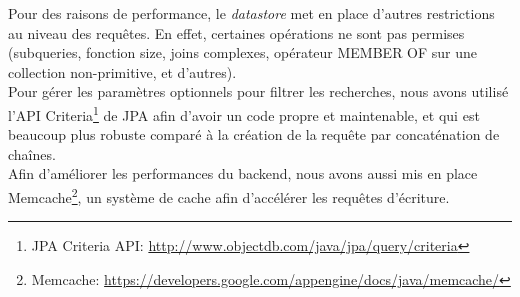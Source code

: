 Pour des raisons de performance, le \emph{datastore} met en place d’autres
restrictions au niveau des requêtes. En effet, certaines opérations ne sont pas permises
(subqueries, fonction size, joins complexes, opérateur MEMBER OF sur une
collection non-primitive, et d'autres).\\

Pour gérer les paramètres optionnels pour filtrer les recherches, nous avons
utilisé l’API Criteria\footnote{JPA Criteria API:
\url{http://www.objectdb.com/java/jpa/query/criteria}} de JPA afin d’avoir un
code propre et maintenable, et qui est beaucoup plus robuste comparé à la
création de la requête par concaténation de chaînes.\\

Afin d'améliorer les performances du backend, nous avons aussi mis en place
Memcache\footnote{Memcache:
\url{https://developers.google.com/appengine/docs/java/memcache/}}, un système
de cache afin d'accélérer les requêtes d'écriture.
